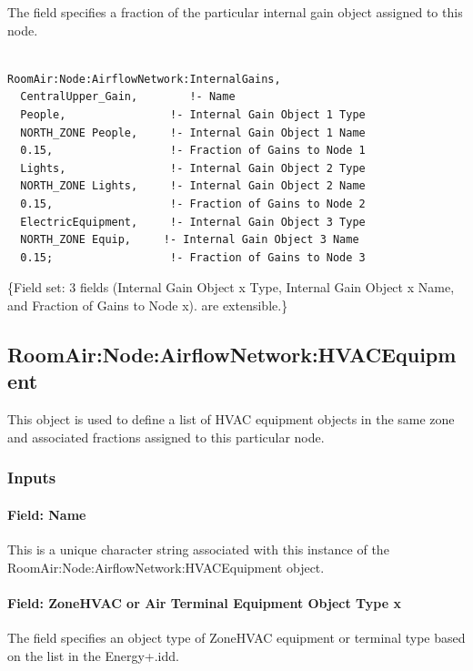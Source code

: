 The field specifies a fraction of the particular internal gain object assigned to this node.

\begin{lstlisting}

RoomAir:Node:AirflowNetwork:InternalGains,
  CentralUpper_Gain,        !- Name
  People,                !- Internal Gain Object 1 Type
  NORTH_ZONE People,     !- Internal Gain Object 1 Name
  0.15,                  !- Fraction of Gains to Node 1
  Lights,                !- Internal Gain Object 2 Type
  NORTH_ZONE Lights,     !- Internal Gain Object 2 Name
  0.15,                  !- Fraction of Gains to Node 2
  ElectricEquipment,     !- Internal Gain Object 3 Type
  NORTH_ZONE Equip,     !- Internal Gain Object 3 Name
  0.15;                  !- Fraction of Gains to Node 3
\end{lstlisting}

\{Field set: 3 fields (Internal Gain Object x Type, Internal Gain Object x Name, and Fraction of Gains to Node x). are extensible.\}

\subsection{RoomAir:Node:AirflowNetwork:HVACEquipment}\label{roomairnodeairflownetworkhvacequipment}

This object is used to define a list of HVAC equipment objects in the same zone and associated fractions assigned to this particular node.

\subsubsection{Inputs}\label{inputs-15-012}

\paragraph{Field: Name}\label{field-name-11-012}

This is a unique character string associated with this instance of the RoomAir:Node:AirflowNetwork:HVACEquipment object.

\paragraph{Field: ZoneHVAC or Air Terminal Equipment Object Type x}\label{field-zonehvac-or-air-terminal-equipment-object-type-x}

The field specifies an object type of ZoneHVAC equipment or terminal type based on the list in the Energy+.idd.

